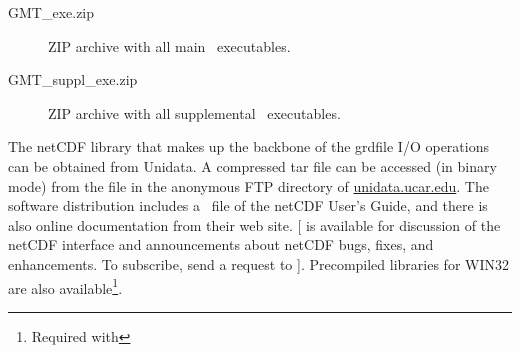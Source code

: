 \begin{description}

\item[GMT\_exe.zip] ZIP archive with all main \GMT\ executables.

\item[GMT\_suppl\_exe.zip] ZIP archive with all supplemental \GMT\ executables.

\end{description}


The netCDF library that makes up the backbone of the grdfile
I/O operations can be obtained from  Unidata.  A compressed
tar file can be accessed (in binary mode) from the file
 in the anonymous FTP directory of
\underline{unidata.ucar.edu}.
The software distribution includes a \PS\ file of
the netCDF User's Guide, and there is also online documentation
from their web site.  [
is available for discussion of the netCDF interface and
announcements about netCDF bugs, fixes, and enhancements.  To
subscribe, send a request to
].
Precompiled libraries for WIN32 are also available\footnote{Required
with }.
